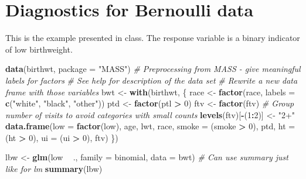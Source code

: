 \documentclass[]{book}
\newenvironment{Shaded}{\begin{snugshade}}{\end{snugshade}}
\newcommand{\CommentTok}[1]{\textcolor[rgb]{0.56,0.35,0.01}{\textit{#1}}}
\newcommand{\DataTypeTok}[1]{\textcolor[rgb]{0.13,0.29,0.53}{#1}}
\newcommand{\DecValTok}[1]{\textcolor[rgb]{0.00,0.00,0.81}{#1}}
\newcommand{\KeywordTok}[1]{\textcolor[rgb]{0.13,0.29,0.53}{\textbf{#1}}}
\newcommand{\NormalTok}[1]{#1}
\newcommand{\OperatorTok}[1]{\textcolor[rgb]{0.81,0.36,0.00}{\textbf{#1}}}
\newcommand{\StringTok}[1]{\textcolor[rgb]{0.31,0.60,0.02}{#1}}
\theoremstyle{definition}
\theoremstyle{definition}
\theoremstyle{definition}
\theoremstyle{remark}
\begin{document}
\hypertarget{diagnostics-for-bernoulli-data}{%
\section{Diagnostics for Bernoulli data}\label{diagnostics-for-bernoulli-data}}

This is the example presented in class. The response variable is a binary indicator of low birthweight.

\begin{Shaded}
\begin{Highlighting}[]
\KeywordTok{data}\NormalTok{(birthwt, }\DataTypeTok{package =} \StringTok{"MASS"}\NormalTok{)}
\CommentTok{# Preprocessing from MASS - give meaningful labels for factors}
\CommentTok{# See help for description of the data set}
\CommentTok{# Rewrite a new data frame with those variables}
\NormalTok{bwt <-}\StringTok{ }\KeywordTok{with}\NormalTok{(birthwt, \{}
\NormalTok{  race <-}\StringTok{ }\KeywordTok{factor}\NormalTok{(race, }\DataTypeTok{labels =} \KeywordTok{c}\NormalTok{(}\StringTok{"white"}\NormalTok{, }\StringTok{"black"}\NormalTok{, }\StringTok{"other"}\NormalTok{))}
\NormalTok{  ptd <-}\StringTok{ }\KeywordTok{factor}\NormalTok{(ptl }\OperatorTok{>}\StringTok{ }\DecValTok{0}\NormalTok{)}
\NormalTok{  ftv <-}\StringTok{ }\KeywordTok{factor}\NormalTok{(ftv) }
  \CommentTok{# Group number of visits to avoid categories with small counts}
  \KeywordTok{levels}\NormalTok{(ftv)[}\OperatorTok{-}\NormalTok{(}\DecValTok{1}\OperatorTok{:}\DecValTok{2}\NormalTok{)] <-}\StringTok{ "2+"}
  \KeywordTok{data.frame}\NormalTok{(}\DataTypeTok{low =} \KeywordTok{factor}\NormalTok{(low), age, lwt, race, }\DataTypeTok{smoke =}\NormalTok{ (smoke }\OperatorTok{>}\StringTok{ }\DecValTok{0}\NormalTok{),}
\NormalTok{             ptd, }\DataTypeTok{ht =}\NormalTok{ (ht }\OperatorTok{>}\StringTok{ }\DecValTok{0}\NormalTok{), }\DataTypeTok{ui =}\NormalTok{ (ui }\OperatorTok{>}\StringTok{ }\DecValTok{0}\NormalTok{), ftv)}
\NormalTok{  \})}

\NormalTok{lbw <-}\StringTok{ }\KeywordTok{glm}\NormalTok{(low }\OperatorTok{~}\StringTok{ }\NormalTok{., }\DataTypeTok{family =}\NormalTok{ binomial, }\DataTypeTok{data =}\NormalTok{ bwt)}
\CommentTok{# Can use summary just like for lm}
\KeywordTok{summary}\NormalTok{(lbw)}
\end{Highlighting}
\end{Shaded}
\end{document}
